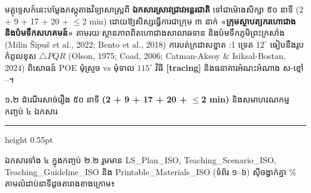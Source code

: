 \documentclass[a4paper,12pt]{article}
\newcommand{\en}[1]{{\TimesEn #1}}
\newcommand{\enbf}[1]{{\TimesEn\textbf{#1}}}
\newcommand{\cnum}[1]{{\TimesEn\fontsize{10.5pt}{12pt}\selectfont\ding{\numexpr181+#1\relax}}}
\newcommand{\tri}[1]{\ensuremath{\triangle #1}}
\newcommand{\subsectitle}[1]{{\muol\fontsize{11pt}{14.5pt}\selectfont #1}}
\newcommand{\subsec}[1]{%
  \Needspace{1.6cm}%
  \vspace{3pt}%
  \subsectitle{#1}\par%
  \vspace{-2pt}%
  {\color{black}\hrule height 0.55pt}%
  \vspace{3pt}%
}
\begin{document}
មគ្គុទ្ទេសក៍នេះបម្លែងភស្តុតាងវិទ្យាសាស្ត្រពី \textbf{ឯកសារស្រាវជ្រាវអន្តរជាតិ} ទៅជាម៉ោងសិក្សា ៥០ នាទី \en{(2 + 9 + 17 + 20 + $\le$2 min)} ដោយឱ្យសិស្សធ្វើការជាក្រុម ៣ នាក់ \textbf{«ក្រុមស្ថាបត្យករហោជាង និងប៉មទឹកសហគមន៍»} តាមរយៈស្ថានភាពពិតហោជាងសាលាឆទាន និងប៉មទឹកភូមិព្រះក្រសាំង \en{(Milin Šipuš et al., 2022; Bento et al., 2018)} ការបត់ក្រដាសខ្នាត \en{1:1} ទ្រេត $12^\circ$ ធៀបនឹងរូបកំពូលខុស $\tri{PQR}$ \en{(Olson, 1975; Coad, 2006; Catman-Aksoy \& Isiksal-Bostan, 2024)} ពិសោធន៍ \en{POE} មុំស្រួច vs មុំទាល $115^\circ$ វិធី \en{\textbf{[tracing]}} និងធនាគារអំណះអំណាង ស-ខ្មៅ \cnum{1}--\cnum{5}។

\subsec{១\enbf{.}២ ដំណើរសាច់រឿង ៥០ នាទី \enbf{(2 + 9 + 17 + 20 + $\le$2 min)} និងសមាហរណកម្មកញ្ចប់ ៤ ឯកសារ}

ឯកសារទាំង ៤ ក្នុងកញ្ចប់ ២.២ រួមមាន \en{LS\_Plan\_ISO}, \en{Teaching\_Scenario\_ISO}, \en{Teaching\_Guideline\_ISO} និង \en{Printable\_Materials\_ISO} (ទំព័រ ១--៦) ស៊ីចង្វាក់គ្នា \en{100\%} តាមលំដាប់នាទីដូចតារាងខាងក្រោម៖
\end{document}
